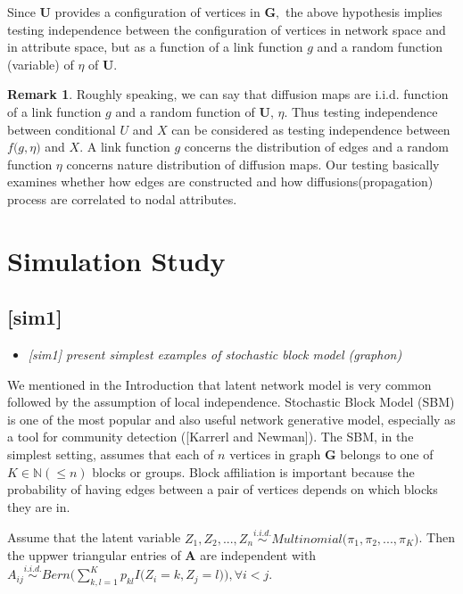 \documentclass[12pt]{article}
\theoremstyle{definition}
\newtheorem{remark}{Remark}
\begin{document}
Since $\boldsymbol{U}$ provides a configuration of vertices in $\boldsymbol{G},$ the above hypothesis implies testing independence between the configuration of vertices in network space and in attribute space, but as a function of a link function $g$ and a random function (variable) of $\eta$ of $\mathbf{U}$.


\begin{remark}
Roughly speaking, we can say that diffusion maps are i.i.d. function of a link function $g$ and a random function of $\mathbf{U}$, $\eta$. Thus testing independence between conditional $U$ and $X$ can be considered as testing independence between $f \big( g, \eta \big)$ and $X$. A link function $g$ concerns the distribution of edges and a random function $\eta$ concerns nature distribution of diffusion maps. Our testing basically examines whether how edges are constructed and how diffusions(propagation) process are correlated to nodal attributes.  
\end{remark}





\newpage
\section{Simulation Study}

\subsection{[sim1]}
\begin{itemize}
	\item {\it  [sim1] present simplest examples of stochastic block model (graphon) \/}
\end{itemize}

 We mentioned in the Introduction that latent network model is very common followed by the assumption of local independence. Stochastic Block Model (SBM) is one of the most popular and also useful network generative model, especially as a tool for community detection ([Karrerl and Newman]). The SBM, in the simplest setting, assumes that each of $n$ vertices in graph $\boldsymbol{G}$ belongs to one of $K \in \mathbb{N} (\leq n)$ blocks or groups. Block affiliation is important because the probability of having edges between a pair of vertices depends on which blocks they are in. 
 
 Assume that the latent variable $Z_{1}, Z_{2}, ... , Z_{n} \overset{i.i.d.}{\sim} Multinomial\big( \pi_{1}, \pi_{2}, ... , \pi_{K} \big)$. Then the uppwer triangular entries of $\mathbf{A}$ are independent with 
 $A_{ij} \overset{i.i.d.}{\sim} Bern\big( \sum\limits_{k,l=1}^{K} p_{kl} I\big( Z_{i} = k, Z_{j} = l  \big)    \big), \forall  i < j$.
 
\end{document}
